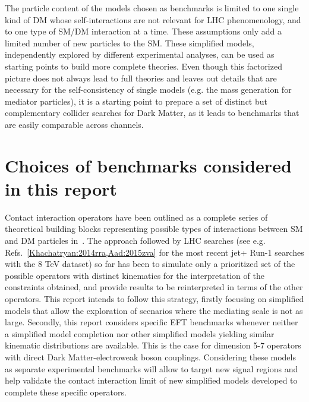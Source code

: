 The particle content of the models chosen as benchmarks is limited to
one single kind of DM whose self-interactions are not relevant for LHC
phenomenology, and to one type of SM/DM interaction at a time. These
assumptions only add a limited number of new particles to the
SM. These simplified models, independently explored by different
experimental analyses, can be used as starting points to build more
complete theories. Even though this factorized picture does not always
lead to full theories and leaves out details that are necessary for
the self-consistency of single models (e.g. the mass generation for
mediator particles), it is a starting point to prepare a set of
distinct but complementary collider searches for Dark Matter, as
it leads to benchmarks that are easily comparable across channels.

\section{Choices of benchmarks considered in this report}

Contact interaction operators have been outlined as a complete series of theoretical
building blocks representing possible types of interactions between SM and DM particles
in~\cite{Goodman:2010ku}. The approach followed by LHC searches (see e.g. Refs.~\ref{Khachatryan:2014rra,Aad:2015zva} 
for the most recent jet+\MET{} Run-1 searches with the 8 TeV dataset) 
so far has been to simulate only a prioritized set of the possible operators with distinct kinematics
for the interpretation of the constraints obtained, and provide results to be reinterpreted in terms of the other operators.
This report intends to follow this strategy, firstly focusing on simplified models that allow the exploration 
of scenarios where the mediating scale is not as large.  
Secondly, this report considers specific EFT benchmarks 
whenever neither a simplified model completion 
nor other simplified models yielding similar kinematic distributions are available. 
This is the case for dimension 5-7 operators with direct 
Dark Matter-electroweak boson couplings. 
Considering these models as separate experimental benchmarks 
will allow to target new signal regions and help validate the 
contact interaction limit of new simplified models 
developed to complete these specific operators. 

